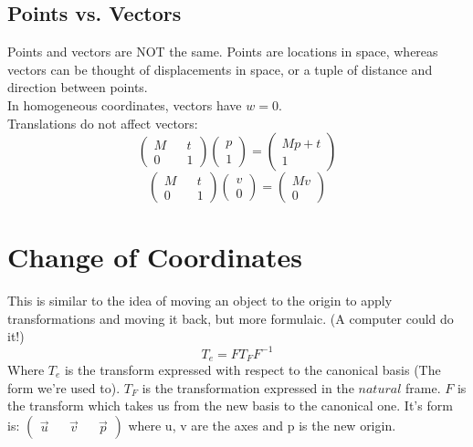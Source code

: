 \documentclass[12pt]{article}
\theoremstyle{definition}
\begin{document}
\subsection{Points vs. Vectors}
Points and vectors are NOT the same. Points are locations in space, whereas vectors can be thought of displacements in space, or a tuple of distance and direction between points.
\\ \linebreak
In homogeneous coordinates, vectors have $w=0$. 
\\ \linebreak
Translations do not affect vectors:
$$\begin{pmatrix}
M && t \\
0 && 1 
\end{pmatrix}
\begin{pmatrix}
p \\ 1
\end{pmatrix}
= \begin{pmatrix}
Mp + t \\ 1
\end{pmatrix}$$
$$
\begin{pmatrix}
M && t \\
0 && 1
\end{pmatrix}
\begin{pmatrix}
v \\ 0
\end{pmatrix}
=
\begin{pmatrix}
Mv \\ 0
\end{pmatrix}$$
\section{Change of Coordinates}
This is similar to the idea of moving an object to the origin to apply transformations and moving it back, but more formulaic. (A computer could do it!)
\\ \linebreak
$$T_e = FT_FF^{-1}$$
Where $T_e$ is the transform expressed with respect to the canonical basis (The form we're used to). $T_F$ is the transformation expressed in the $natural$ frame. $F$ is the transform which takes us from the new basis to the canonical one. It's form is: $\begin{pmatrix}\vec{u} && \vec{v} && \vec{p}\end{pmatrix}$ where u, v are the axes and p is the new origin.
\\ \linebreak
\end{document}
